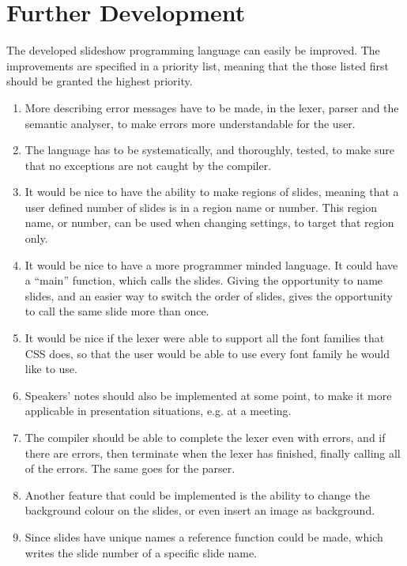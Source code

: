 \chapter{Further Development}
\label{sec:furtherdev}
The developed slideshow programming language can easily be improved. The improvements are specified in a priority list, meaning that the those listed first should be granted the highest priority.

\begin{enumerate}
	\item More describing error messages have to be made, in the lexer, parser and the semantic analyser, to make errors more understandable for the user.
	\item The language has to be systematically, and thoroughly, tested, to make sure that no exceptions are not caught by the compiler.
	\item It would be nice to have the ability to make regions of slides, meaning that a user defined number of slides is in a region name or number. This region name, or number, can be used when changing settings, to target that region only.
	\item It would be nice to have a more programmer minded language. It could have a ``main'' function, which calls the slides. Giving the opportunity to name slides, and an easier way to switch the order of slides, gives the opportunity to call the same slide more than once.
	\item It would be nice if the lexer were able to support all the font families that CSS does, so that the user would be able to use every font family he would like to use.
	\item Speakers' notes should also be implemented at some point, to make it more applicable in presentation situations, e.g. at a meeting.
	\item The compiler should be able to complete the lexer even with errors, and if there are errors, then terminate when the lexer has finished, finally calling all of the errors. The same goes for the parser.
	\item Another feature that could be implemented is the ability to change the background colour on the slides, or even insert an image as background.
	\item Since slides have unique names a reference function could be made, which writes the slide number of a specific slide name.
\end{enumerate}